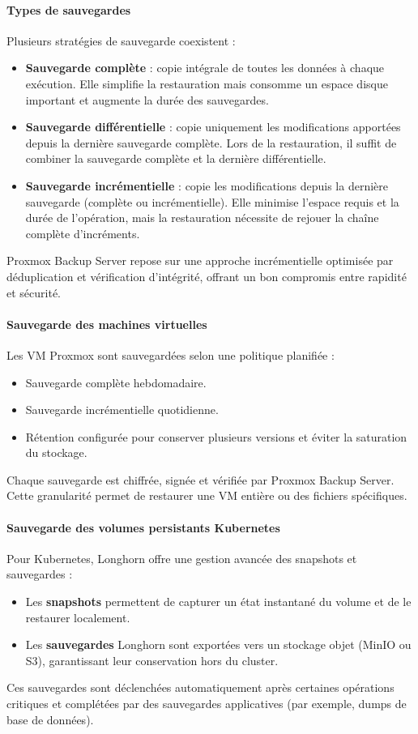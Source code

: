 \paragraph{Types de sauvegardes}
Plusieurs stratégies de sauvegarde coexistent :

\begin{itemize}
	\item \textbf{Sauvegarde complète} : copie intégrale de toutes les données à chaque exécution. Elle simplifie la restauration mais consomme un espace disque important et augmente la durée des sauvegardes.
	\item \textbf{Sauvegarde différentielle} : copie uniquement les modifications apportées depuis la dernière sauvegarde complète. Lors de la restauration, il suffit de combiner la sauvegarde complète et la dernière différentielle.
	\item \textbf{Sauvegarde incrémentielle} : copie les modifications depuis la dernière sauvegarde (complète ou incrémentielle). Elle minimise l’espace requis et la durée de l’opération, mais la restauration nécessite de rejouer la chaîne complète d’incréments.
\end{itemize}
Proxmox Backup Server repose sur une approche incrémentielle optimisée par déduplication et vérification d’intégrité, offrant un bon compromis entre rapidité et sécurité.

\paragraph{Sauvegarde des machines virtuelles}
Les VM Proxmox sont sauvegardées selon une politique planifiée :
\begin{itemize}
	\item Sauvegarde complète hebdomadaire.
	\item Sauvegarde incrémentielle quotidienne.
	\item Rétention configurée pour conserver plusieurs versions et éviter la saturation du stockage.
\end{itemize}
Chaque sauvegarde est chiffrée, signée et vérifiée par Proxmox Backup Server. Cette granularité permet de restaurer une VM entière ou des fichiers spécifiques.

\paragraph{Sauvegarde des volumes persistants Kubernetes}
Pour Kubernetes, Longhorn offre une gestion avancée des snapshots et sauvegardes :
\begin{itemize}
	\item Les \textbf{snapshots} permettent de capturer un état instantané du volume et de le restaurer localement.
	\item Les \textbf{sauvegardes} Longhorn sont exportées vers un stockage objet (MinIO ou S3), garantissant leur conservation hors du cluster.
\end{itemize}
Ces sauvegardes sont déclenchées automatiquement après certaines opérations critiques et complétées par des sauvegardes applicatives (par exemple, dumps de base de données).

